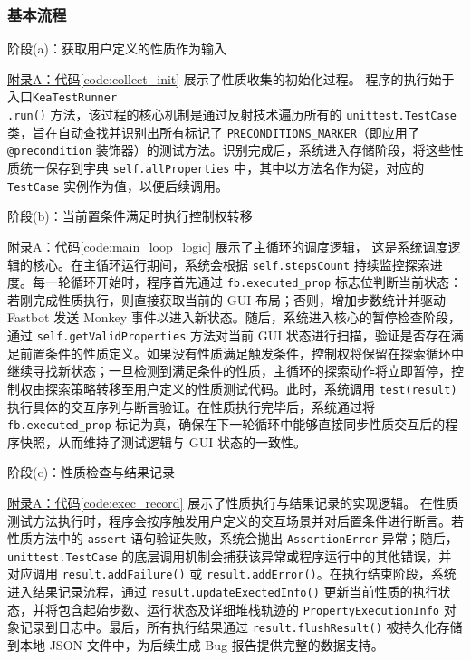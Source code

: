 \documentclass[a4paper, zihao=-4]{ctexart}
\newcommand{\bff}[1]{{\heiti #1}}
\begin{document}
\subsubsection{基本流程}

\bff{阶段(a)：获取用户定义的性质作为输入}

\hyperref[code:collect_init]{附录A：代码\ref{code:collect_init}} 展示了性质收集的初始化过程。
程序的执行始于{入口}\texttt{KeaTestRunner}\\
\texttt{.run()} 方法，该过程的核心{机制}是通过反射技术遍历所有的 \texttt{unittest.TestCase} 类，旨在自动查找并识别出所有标记了 \texttt{PRECONDITIONS\_MARKER}（即应用了 \texttt{@precondition} 装饰器）的测试方法。识别完成后，系统进入{存储}阶段，将这些性质统一保存到字典 \texttt{self.allProperties} 中，其中以方法名作为键，对应的 \texttt{TestCase} 实例作为值，以便后续调用。

\bff{阶段(b)：当前置条件满足时执行控制权转移}

\hyperref[code:main_loop_logic]{附录A：代码\ref{code:main_loop_logic}} 展示了主循环的调度逻辑，
这是系统调度逻辑的核心。在主循环运行期间，系统会根据 \texttt{self.stepsCount} 持续监控探索进度。每一轮循环开始时，程序首先通过 \texttt{fb.executed\_prop} 标志位判断当前状态：若刚完成性质执行，则直接获取当前的 {GUI} 布局；否则，增加步数统计并驱动 {Fastbot} 发送 {Monkey} 事件以进入新状态。随后，系统进入核心的暂停检查阶段，通过 \texttt{self.getValidProperties} 方法对当前 {GUI} 状态进行扫描，验证是否存在满足前置条件的性质定义。如果没有性质满足触发条件，控制权将保留在探索循环中继续寻找新状态；一旦检测到满足条件的性质，主循环的探索动作将立即暂停，控制权由探索策略转移至用户定义的性质测试代码。此时，系统调用 \texttt{test(result)} 执行具体的交互序列与断言验证。在性质执行完毕后，系统通过将 \texttt{fb.executed\_prop} 标记为真，确保在下一轮循环中能够直接同步性质交互后的程序快照，从而维持了测试逻辑与 {GUI} 状态的一致性。

\bff{阶段(c)：性质检查与结果记录}

\hyperref[code:exec_record]{附录A：代码\ref{code:exec_record}} 展示了性质执行与结果记录的实现逻辑。
在性质测试方法执行时，程序会按序触发用户定义的交互场景并对后置条件进行断言。若性质方法中的 \texttt{assert} 语句验证失败，系统会抛出 \texttt{AssertionError} 异常；随后， \texttt{unittest.TestCase} 的底层调用机制会捕获该异常或程序运行中的其他错误，并对应调用 \texttt{result.addFailure()} 或 \texttt{result.addError()}。在执行结束阶段，系统进入结果记录流程，通过 \texttt{result.updateExectedInfo()} 更新当前性质的执行状态，并将包含起始步数、运行状态及详细堆栈轨迹的 \texttt{PropertyExecutionInfo} 对象记录到日志中。最后，所有执行结果通过 \texttt{result.flushResult()} 被持久化存储到本地 JSON 文件中，为后续生成 {Bug} 报告提供完整的数据支持。
\end{document}
